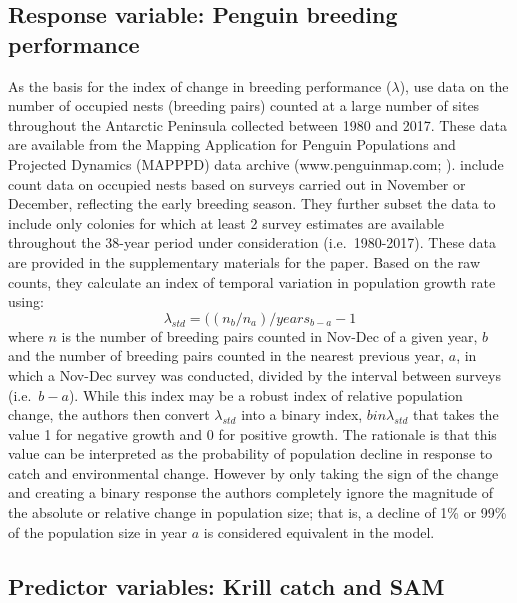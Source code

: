 \documentclass[]{elsarticle} %
\begin{document}
\subsection{Response variable: Penguin breeding
performance}\label{response-variable-penguin-breeding-performance}

As the basis for the index of change in breeding performance
(\(\lambda\)), \citet{Kruger2021} use data on the number of occupied
nests (breeding pairs) counted at a large number of sites throughout the
Antarctic Peninsula collected between 1980 and 2017. These data are
available from the Mapping Application for Penguin Populations and
Projected Dynamics (MAPPPD) data archive (www.penguinmap.com;
\citet{Humphries2017}). \citet{Kruger2021} include count data on
occupied nests based on surveys carried out in November or December,
reflecting the early breeding season. They further subset the data to
include only colonies for which at least 2 survey estimates are
available throughout the 38-year period under consideration
(i.e.~1980-2017). These data are provided in the supplementary materials
for the paper. Based on the raw counts, they calculate an index of
temporal variation in population growth rate using:
\[\lambda_{std}=((n_b/n_a)/years_{b-a}-1\] where \(n\) is the number of
breeding pairs counted in Nov-Dec of a given year, \(b\) and the number
of breeding pairs counted in the nearest previous year, \(a\), in which
a Nov-Dec survey was conducted, divided by the interval between surveys
(i.e.~\(b-a\)). While this index may be a robust index of relative
population change, the authors then convert \(\lambda_{std}\) into a
binary index, \(bin\lambda_{std}\) that takes the value 1 for negative
growth and 0 for positive growth. The rationale is that this value can
be interpreted as the probability of population decline in response to
catch and environmental change. However by only taking the sign of the
change and creating a binary response the authors completely ignore the
magnitude of the absolute or relative change in population size; that
is, a decline of 1\% or 99\% of the population size in year \(a\) is
considered equivalent in the model.

\subsection{Predictor variables: Krill catch and
SAM}\label{predictor-variables-krill-catch-and-sam}
\end{document}
